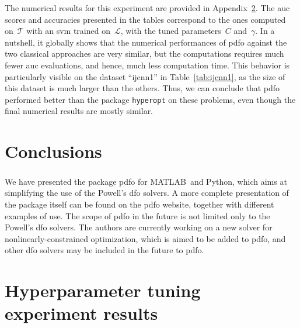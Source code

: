 \documentclass[11pt,draft]{article}
\numberwithin{equation}{section}
\def\matlab{\mbox{MATLAB\textsuperscript{\textregistered}}}
\def\python{\mbox{Python}}
\begin{document}
The numerical results for this experiment are provided in Appendix~\ref{sec:htres}.
The \gls{auc} scores and accuracies presented in the tables correspond to the ones computed on~$\mathcal{T}$ with an \gls{svm} trained on~$\mathcal{L}$, with the tuned parameters~$C$ and~$\gamma$.
In a nutshell, it globally shows that the numerical performances of \gls{pdfo} against the two classical approaches are very similar, but the computations requires much fewer \gls{auc} evaluations, and hence, much less computation time.
This behavior is particularly visible on the dataset \enquote{ijcnn1} in Table~\ref{tab:ijcnn1}, as the size of this dataset is much larger than the others.
Thus, we can conclude that \gls{pdfo} performed better than the package \texttt{hyperopt} on these problems, even though the final numerical results are mostly similar.

\section{Conclusions}

We have presented the package \gls{pdfo} for \matlab\ and \python, which aims at simplifying the use of the Powell's \gls{dfo} solvers.
A more complete presentation of the package itself can be found on the \gls{pdfo} website, together with different examples of use.
The scope of \gls{pdfo} in the future is not limited only to the Powell's \gls{dfo} solvers.
The authors are currently working on a new solver for nonlinearly-constrained optimization, which is aimed to be added to \gls{pdfo}, and other \gls{dfo} solvers may be included in the future to \gls{pdfo}.

\printbibliography

\appendix
\clearpage

\section{Hyperparameter tuning experiment results}
\label{sec:htres}
\end{document}
